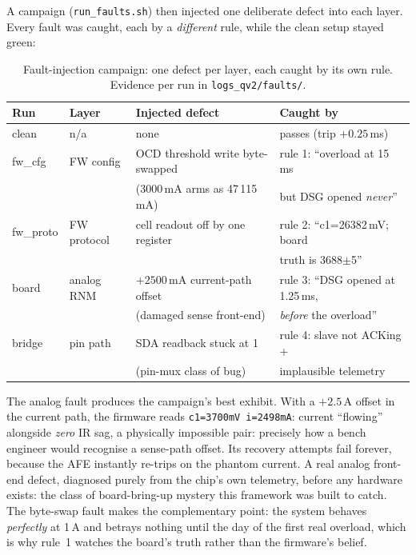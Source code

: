 \documentclass[11pt]{article}
\begin{document}
A campaign (\texttt{run\_faults.sh}) then injected one deliberate
defect into each layer.  Every fault was caught, each by a
\emph{different} rule, while the clean setup stayed green:

\begin{table}[htbp]
\centering
\small
\begin{tabular}{@{}llll@{}}
\toprule
Run & Layer & Injected defect & Caught by \\
\midrule
clean     & n/a       & none                              & passes (trip $+0.25$\,ms) \\
fw\_cfg   & FW config & OCD threshold write byte-swapped  & rule 1: ``overload at 15\,ms \\
          &           & (3000\,mA arms as 47\,115\,mA)    & \quad but DSG opened \emph{never}'' \\
fw\_proto & FW protocol & cell readout off by one register & rule 2: ``c1=26382\,mV; board \\
          &           &                                   & \quad truth is 3688$\pm$5'' \\
board     & analog RNM & $+2500$\,mA current-path offset  & rule 3: ``DSG opened at 1.25\,ms, \\
          &           & (damaged sense front-end)         & \quad \emph{before} the overload'' \\
bridge    & pin path  & SDA readback stuck at 1           & rule 4: slave not ACKing + \\
          &           & (pin-mux class of bug)            & \quad implausible telemetry \\
\bottomrule
\end{tabular}
\caption{Fault-injection campaign: one defect per layer, each caught
by its own rule.  Evidence per run in
\texttt{logs\_qv2/faults/}.}
\label{tab:faults}
\end{table}

The analog fault produces the campaign's best exhibit.  With a
$+2.5$\,A offset in the current path, the firmware reads
\texttt{c1=3700mV i=2498mA}: current ``flowing'' alongside \emph{zero}
IR sag, a physically impossible pair: precisely how a bench
engineer would recognise a sense-path offset.  Its recovery attempts
fail forever, because the AFE instantly re-trips on the phantom
current.  A real analog front-end defect, diagnosed purely from the
chip's own telemetry, before any hardware exists: the class of
board-bring-up mystery this framework was built to catch.  The
byte-swap fault makes the complementary point: the system behaves
\emph{perfectly} at 1\,A and betrays nothing until the day of the
first real overload, which is why rule~1 watches the board's truth
rather
than the firmware's belief.
\end{document}
